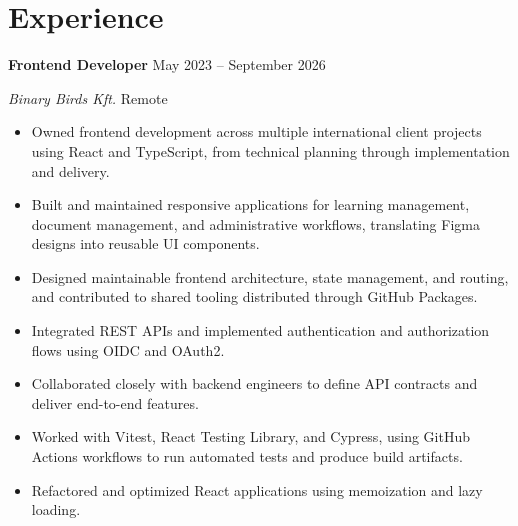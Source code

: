 \section{Experience}

\textbf{Frontend Developer}
\hfill
May 2023 -- September 2026

\textit{Binary Birds Kft.}
\hfill
Remote

\begin{itemize}
    \item Owned frontend development across multiple international client projects using React and TypeScript, from technical planning through implementation and delivery.

    \item Built and maintained responsive applications for learning management, document management, and administrative workflows, translating Figma designs into reusable UI components.

    \item Designed maintainable frontend architecture, state management, and routing, and contributed to shared tooling distributed through GitHub Packages.

    \item Integrated REST APIs and implemented authentication and authorization flows using OIDC and OAuth2.

    \item Collaborated closely with backend engineers to define API contracts and deliver end-to-end features.

    \item Worked with Vitest, React Testing Library, and Cypress, using GitHub Actions workflows to run automated tests and produce build artifacts.

    \item Refactored and optimized React applications using memoization and lazy loading.
\end{itemize}
